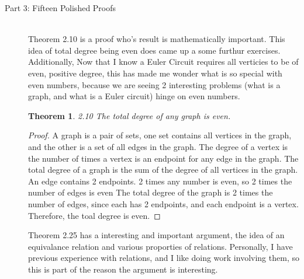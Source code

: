 \documentclass{article}
\newtheorem*{thm}{Theorem}
\begin{document}
\begin{description}
	\item[Part 3: Fifteen Polished Proofs] \hfil \\
		Theorem 2.10 is a proof who's result is mathematically important. This idea of total degree being even does came up a some furthur exercises. Additionally, Now that I know a Euler Circuit requires all verticies to be of even, positive degree, this has made me wonder what is so special with even numbers, because we are seeing 2 interesting problems (what is a graph, and what is a Euler circuit) hinge on even numbers.
		
		\begin{thm}2.10     The total degree of any graph is even.\end{thm}
 		 \begin{proof}  A graph is a pair of sets, one set contains all vertices in the graph, and the other is a set of all edges in the graph.
       				The degree of a vertex is the number of times a vertex is an endpoint for any edge in the graph. 
				The total degree of a graph is the sum of the degree of all vertices in the graph. 
				An edge contains 2 endpoints. 
				2 times any number is even, so 2 times the number of edges is even 
				The total degree of the graph is 2 times the number of edges, since each has 2 endpoints, and each endpoint is a vertex. 
       				Therefore, the toal degree is even.  \end{proof}

		Theorem 2.25 has a interesting and important argument, the idea of an equivalance relation and various proporties of relations.	
		Personally, I have previous experience with relations, and I like doing work involving them, so this is part of the reason the argument
		is interesting. 


\end{description}
\end{document}
